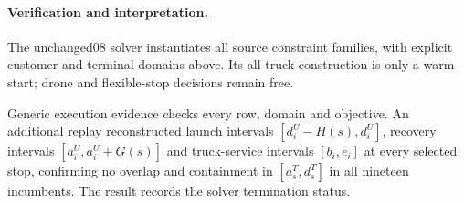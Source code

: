 \documentclass[11pt]{article}
\begin{document}
\paragraph{Verification and interpretation.}
The unchanged08 solver instantiates all source constraint families, with
explicit customer and terminal domains above. Its all-truck construction is
only a warm start; drone and flexible-stop decisions remain free.

Generic execution evidence checks every row, domain and objective.
An additional replay reconstructed launch intervals
$[d_i^U-H(s),d_i^U]$, recovery intervals $[a_i^U,a_i^U+G(s)]$
and truck-service intervals $[b_i,e_i]$ at every selected stop,
confirming no overlap and containment in $[a_s^T,d_s^T]$ in all nineteen
incumbents. The result records the solver termination status.
\end{document}
